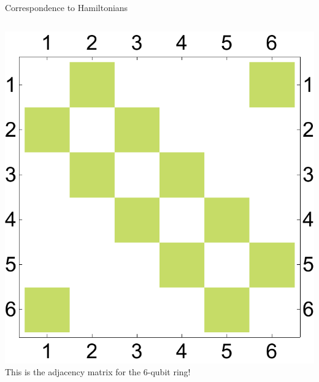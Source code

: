 \documentclass{beamer}
\begin{document}
\begin{frame}{Correspondence to Hamiltonians}
\begin{columns}[T]
{\begin{column}{0.33\textwidth}
     		\includegraphics[trim=0 0 0 0mm, width=\textwidth]{Images/adj_ring6_1}\\
     		This is the adjacency matrix for the 6-qubit ring!
		\end{column}}
	\end{columns}
\end{frame}
\end{document}
